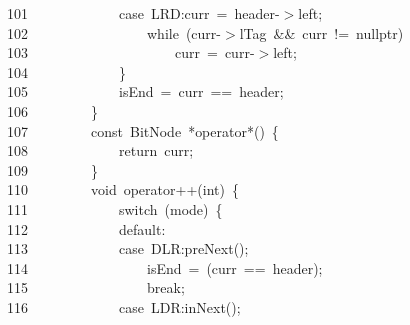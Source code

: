 \documentclass[11pt,a4paper]{ctexart}
\newcommand{\hlstd}[1]{\textcolor[rgb]{0.2,0.2,0.2}{#1}}
\newcommand{\hlopt}[1]{\textcolor[rgb]{0.2,0.2,0.2}{#1}}
\newcommand{\hllin}[1]{\textcolor[rgb]{0.59,0.59,0.59}{#1}}
\newcommand{\hlkwa}[1]{\textcolor[rgb]{0.23,0.42,0.78}{#1}}
\newcommand{\hlkwb}[1]{\textcolor[rgb]{0.63,0,0.31}{#1}}
\newcommand{\hlkwc}[1]{\textcolor[rgb]{0,0.63,0.31}{#1}}
\newcommand{\hlkwd}[1]{\textcolor[rgb]{0.78,0.23,0.41}{#1}}
\begin{document}
\hllin{101\ }\hlstd{}\hlstd{\ \ \ \ \ \ \ \ \ \ \ \ }\hlstd{}\hlkwa{case\ }\hlstd{LRD}\hlopt{:}\hlstd{curr\ }\hlopt{=\ }\hlstd{header}\hlopt{{-}$>$}\hlstd{left}\hlopt{;}\\
\hllin{102\ }\hlstd{}\hlstd{\ \ \ \ \ \ \ \ \ \ \ \ \ \ \ \ }\hlstd{}\hlkwa{while\ }\hlstd{}\hlopt{(}\hlstd{curr}\hlopt{{-}$>$}\hlstd{lTag\ }\hlopt{\&\&\ }\hlstd{curr\ }\hlopt{!=\ }\hlstd{}\hlkwc{nullptr}\hlstd{}\hlopt{)}\\
\hllin{103\ }\hlstd{}\hlstd{\ \ \ \ \ \ \ \ \ \ \ \ \ \ \ \ \ \ \ \ }\hlstd{curr\ }\hlopt{=\ }\hlstd{curr}\hlopt{{-}$>$}\hlstd{left}\hlopt{;}\\
\hllin{104\ }\hlstd{}\hlstd{\ \ \ \ \ \ \ \ \ \ \ \ }\hlstd{}\hlopt{\}}\\
\hllin{105\ }\hlstd{}\hlstd{\ \ \ \ \ \ \ \ \ \ \ \ }\hlstd{isEnd\ }\hlopt{=\ }\hlstd{curr\ }\hlopt{==\ }\hlstd{header}\hlopt{;}\\
\hllin{106\ }\hlstd{}\hlstd{\ \ \ \ \ \ \ \ }\hlstd{}\hlopt{\}}\\
\hllin{107\ }\hlstd{}\hlstd{\ \ \ \ \ \ \ \ }\hlstd{}\hlkwb{const\ }\hlstd{BitNode\ }\hlopt{{*}}\hlstd{}\hlkwc{operator}\hlstd{}\hlopt{{*}()\ \{}\\
\hllin{108\ }\hlstd{}\hlstd{\ \ \ \ \ \ \ \ \ \ \ \ }\hlstd{}\hlkwa{return\ }\hlstd{curr}\hlopt{;}\\
\hllin{109\ }\hlstd{}\hlstd{\ \ \ \ \ \ \ \ }\hlstd{}\hlopt{\}}\\
\hllin{110\ }\hlstd{}\hlstd{\ \ \ \ \ \ \ \ }\hlstd{}\hlkwb{void\ }\hlstd{}\hlkwc{operator}\hlstd{}\hlopt{++(}\hlstd{}\hlkwb{int}\hlstd{}\hlopt{)\ \{}\\
\hllin{111\ }\hlstd{}\hlstd{\ \ \ \ \ \ \ \ \ \ \ \ }\hlstd{}\hlkwa{switch\ }\hlstd{}\hlopt{(}\hlstd{mode}\hlopt{)\ \{}\\
\hllin{112\ }\hlstd{}\hlstd{\ \ \ \ \ \ \ \ \ \ \ \ }\hlstd{}\hlkwa{default}\hlstd{}\hlopt{:}\\
\hllin{113\ }\hlstd{}\hlstd{\ \ \ \ \ \ \ \ \ \ \ \ }\hlstd{}\hlkwa{case\ }\hlstd{DLR}\hlopt{:}\hlstd{}\hlkwd{preNext}\hlstd{}\hlopt{();}\\
\hllin{114\ }\hlstd{}\hlstd{\ \ \ \ \ \ \ \ \ \ \ \ \ \ \ \ }\hlstd{isEnd\ }\hlopt{=\ (}\hlstd{curr\ }\hlopt{==\ }\hlstd{header}\hlopt{);}\\
\hllin{115\ }\hlstd{}\hlstd{\ \ \ \ \ \ \ \ \ \ \ \ \ \ \ \ }\hlstd{}\hlkwa{break}\hlstd{}\hlopt{;}\\
\hllin{116\ }\hlstd{}\hlstd{\ \ \ \ \ \ \ \ \ \ \ \ }\hlstd{}\hlkwa{case\ }\hlstd{LDR}\hlopt{:}\hlstd{}\hlkwd{inNext}\hlstd{}\hlopt{();}\\
\end{document}
